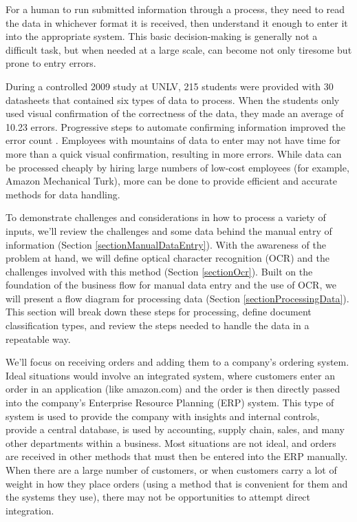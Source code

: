 \documentclass[conference]{IEEEtran}
\begin{document}
For a human to run submitted information through a process, they need to read the data in whichever format it is received, then understand it enough to enter it into the appropriate system. This basic decision-making is generally not a difficult task, but when needed at a large scale, can become not only tiresome but prone to entry errors. 

During a controlled 2009 study at UNLV, 215 students were provided with 30 datasheets that contained six types of data to process. When the students only used visual confirmation of the correctness of the data, they made an average of 10.23 errors. Progressive steps to automate confirming information improved the error count \cite{harris2014when}. Employees with mountains of data to enter may not have time for more than a quick visual confirmation, resulting in more errors. While data can be processed cheaply by hiring large numbers of low-cost employees (for example, Amazon Mechanical Turk), more can be done to provide efficient and accurate methods for data handling.

To demonstrate challenges and considerations in how to process a variety of inputs, we'll review the challenges and some data behind the manual entry of information (Section \ref{sectionManualDataEntry}). With the awareness of the problem at hand, we will define optical character recognition (OCR) and the challenges involved with this method (Section \ref{sectionOcr}). Built on the foundation of the business flow for manual data entry and the use of OCR, we will present a flow diagram for processing data (Section \ref{sectionProcessingData}). This section will break down these steps for processing, define document classification types, and review the steps needed to handle the data in a repeatable way.

We'll focus on receiving orders and adding them to a company's ordering system. Ideal situations would involve an integrated system, where customers enter an order in an application (like amazon.com) and the order is then directly passed into the company's Enterprise Resource Planning (ERP) system. This type of system is used to provide the company with insights and internal controls, provide a central database, is used by accounting, supply chain, sales, and many other departments within a business. Most situations are not ideal, and orders are received in other methods that must then be entered into the ERP manually. When there are a large number of customers, or when customers carry a lot of weight in how they place orders (using a method that is convenient for them and the systems they use), there may not be opportunities to attempt direct integration.
\end{document}
